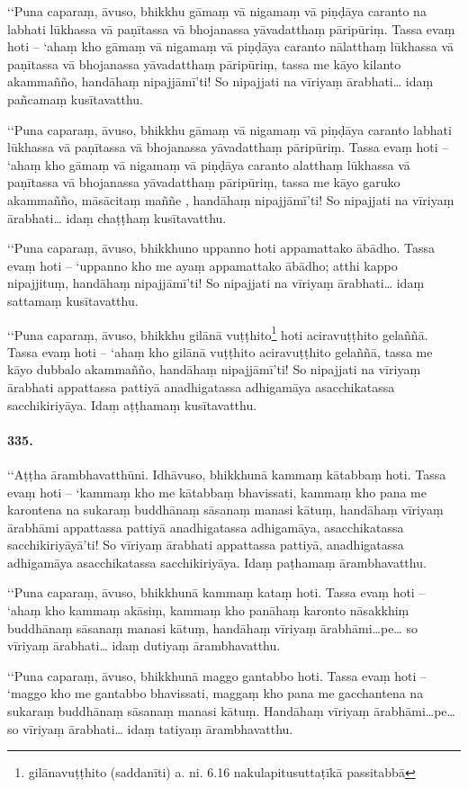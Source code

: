 ‘‘Puna caparaṃ, āvuso, bhikkhu gāmaṃ vā nigamaṃ vā piṇḍāya caranto na labhati lūkhassa vā paṇītassa vā bhojanassa yāvadatthaṃ pāripūriṃ. Tassa evaṃ hoti – ‘ahaṃ kho gāmaṃ vā nigamaṃ vā piṇḍāya caranto nālatthaṃ lūkhassa vā paṇītassa vā bhojanassa yāvadatthaṃ pāripūriṃ, tassa me kāyo kilanto akammañño, handāhaṃ nipajjāmī’ti! So nipajjati na vīriyaṃ ārabhati… idaṃ pañcamaṃ kusītavatthu.

‘‘Puna caparaṃ, āvuso, bhikkhu gāmaṃ vā nigamaṃ vā piṇḍāya caranto labhati lūkhassa vā paṇītassa vā bhojanassa yāvadatthaṃ pāripūriṃ. Tassa evaṃ hoti – ‘ahaṃ kho gāmaṃ vā nigamaṃ vā piṇḍāya caranto alatthaṃ lūkhassa vā paṇītassa vā bhojanassa yāvadatthaṃ pāripūriṃ, tassa me kāyo garuko akammañño, māsācitaṃ maññe , handāhaṃ nipajjāmī’ti! So nipajjati na vīriyaṃ ārabhati… idaṃ chaṭṭhaṃ kusītavatthu.

‘‘Puna caparaṃ, āvuso, bhikkhuno uppanno hoti appamattako ābādho. Tassa evaṃ hoti – ‘uppanno kho me ayaṃ appamattako ābādho; atthi kappo nipajjituṃ, handāhaṃ nipajjāmī’ti! So nipajjati na vīriyaṃ ārabhati… idaṃ sattamaṃ kusītavatthu.

‘‘Puna caparaṃ, āvuso, bhikkhu gilānā vuṭṭhito\footnote{gilānavuṭṭhito (saddanīti) a. ni. 6.16 nakulapitusuttaṭīkā passitabbā} hoti aciravuṭṭhito gelaññā. Tassa evaṃ hoti – ‘ahaṃ kho gilānā vuṭṭhito aciravuṭṭhito gelaññā, tassa me kāyo dubbalo akammañño, handāhaṃ nipajjāmī’ti! So nipajjati na vīriyaṃ ārabhati appattassa pattiyā anadhigatassa adhigamāya asacchikatassa sacchikiriyāya. Idaṃ aṭṭhamaṃ kusītavatthu.

\paragraph{335.} ‘‘Aṭṭha ārambhavatthūni. Idhāvuso, bhikkhunā kammaṃ kātabbaṃ hoti. Tassa evaṃ hoti – ‘kammaṃ kho me kātabbaṃ bhavissati, kammaṃ kho pana me karontena na sukaraṃ buddhānaṃ sāsanaṃ manasi kātuṃ, handāhaṃ vīriyaṃ ārabhāmi appattassa pattiyā anadhigatassa adhigamāya, asacchikatassa sacchikiriyāyā’ti! So vīriyaṃ ārabhati appattassa pattiyā, anadhigatassa adhigamāya asacchikatassa sacchikiriyāya. Idaṃ paṭhamaṃ ārambhavatthu.

‘‘Puna caparaṃ, āvuso, bhikkhunā kammaṃ kataṃ hoti. Tassa evaṃ hoti – ‘ahaṃ kho kammaṃ akāsiṃ, kammaṃ kho panāhaṃ karonto nāsakkhiṃ buddhānaṃ sāsanaṃ manasi kātuṃ, handāhaṃ vīriyaṃ ārabhāmi…pe… so vīriyaṃ ārabhati… idaṃ dutiyaṃ ārambhavatthu.

‘‘Puna caparaṃ, āvuso, bhikkhunā maggo gantabbo hoti. Tassa evaṃ hoti – ‘maggo kho me gantabbo bhavissati, maggaṃ kho pana me gacchantena na sukaraṃ buddhānaṃ sāsanaṃ manasi kātuṃ. Handāhaṃ vīriyaṃ ārabhāmi…pe… so vīriyaṃ ārabhati… idaṃ tatiyaṃ ārambhavatthu.

